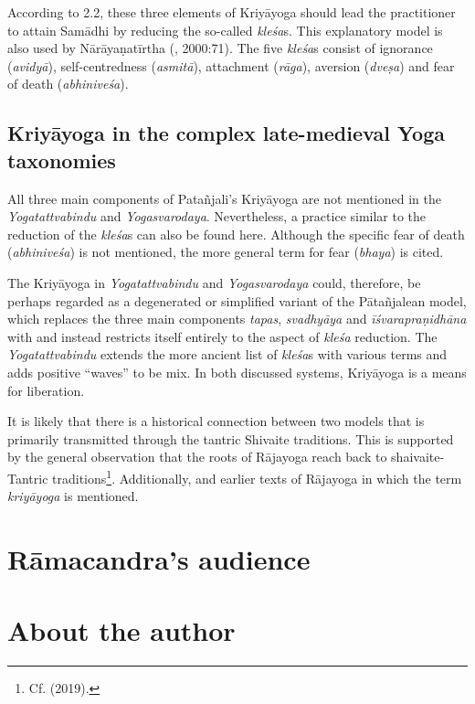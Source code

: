 According to  2.2, these three elements of Kriyāyoga should lead the practitioner to attain Samādhi by reducing the so-called \textit{kleśa}s. This explanatory model is also used by Nārāyaṇatīrtha (\citeauthor{yogacandrika}, 2000:71). The five \textit{kleśa}s consist of ignorance (\textit{avidyā}), self-centredness (\textit{asmitā}), attachment (\textit{rāga}), aversion (\textit{dveṣa}) and fear of death (\textit{abhiniveśa}). 

\subsection{Kriyāyoga in the complex late-medieval Yoga taxonomies}

All three main components of Patañjali's Kriyāyoga are not mentioned in the \textit{Yogatattvabindu} and \textit{Yogasvarodaya}. Nevertheless, a practice similar to the reduction of the \textit{kleśa}s can also be found here. Although the specific fear of death (\textit{abhiniveśa}) is not mentioned, the more general term for fear (\textit{bhaya}) is cited.

The Kriyāyoga in \textit{Yogatattvabindu} and \textit{Yogasvarodaya} could, therefore, be perhaps regarded as a degenerated or simplified variant of the Pātañjalean model, which replaces the three main components \textit{tapas}, \textit{svadhyāya} and \textit{īśvarapraṇidhāna} with and instead restricts itself entirely to the aspect of \textit{kleśa} reduction. The \textit{Yogatattvabindu} extends the more ancient list of \textit{kleśa}s with various terms and adds positive ``waves'' to be mix. In both discussed systems, Kriyāyoga is a means for liberation.

It is likely that there is a historical connection between two models that is primarily transmitted through the tantric Shivaite traditions. This is supported by the general observation that the roots of Rājayoga reach back to shaivaite-Tantric traditions\footnote{Cf. \citeauthor{birch2019saiva} (2019).}. Additionally,  and earlier texts of Rājayoga in which the term \textit{kriyāyoga} is mentioned.



\section{Rāmacandra's audience}

\section{About the author}

